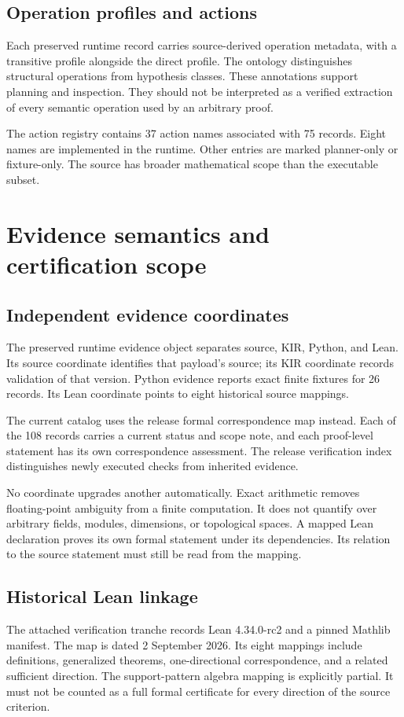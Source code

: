 \documentclass[a4paper,11pt]{article}
\begin{document}
\subsection{Operation profiles and actions}
Each preserved runtime record carries source-derived operation metadata, with a transitive profile alongside the direct profile. The ontology distinguishes structural operations from hypothesis classes. These annotations support planning and inspection. They should not be interpreted as a verified extraction of every semantic operation used by an arbitrary proof.

The action registry contains 37 action names associated with 75 records. Eight names are implemented in the runtime. Other entries are marked planner-only or fixture-only. The source has broader mathematical scope than the executable subset.

\section{Evidence semantics and certification scope}
\subsection{Independent evidence coordinates}
The preserved runtime evidence object separates source, KIR, Python, and Lean. Its source coordinate identifies that payload's source; its KIR coordinate records validation of that version. Python evidence reports exact finite fixtures for 26 records. Its Lean coordinate points to eight historical source mappings.

The current catalog uses the release formal correspondence map instead. Each of the 108 records carries a current status and scope note, and each proof-level statement has its own correspondence assessment. The release verification index distinguishes newly executed checks from inherited evidence.

No coordinate upgrades another automatically. Exact arithmetic removes floating-point ambiguity from a finite computation. It does not quantify over arbitrary fields, modules, dimensions, or topological spaces. A mapped Lean declaration proves its own formal statement under its dependencies. Its relation to the source statement must still be read from the mapping.


\subsection{Historical Lean linkage}
The attached verification tranche records Lean 4.34.0-rc2 and a pinned Mathlib manifest. The map is dated 2 September 2026. Its eight mappings include definitions, generalized theorems, one-directional correspondence, and a related sufficient direction. The support-pattern algebra mapping is explicitly partial. It must not be counted as a full formal certificate for every direction of the source criterion.
\end{document}
